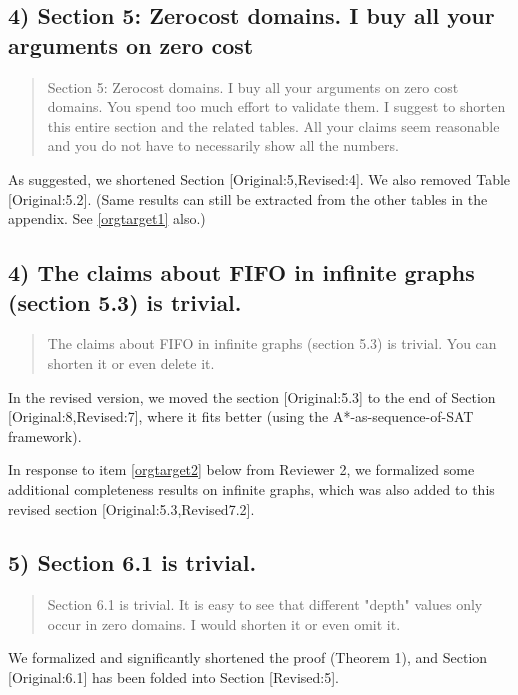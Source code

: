 \documentclass{article}
\begin{document}
\subsection{4) Section 5: Zerocost domains. I buy all your arguments on zero cost}
\label{sec:orgheadline4}

\begin{quote}
Section 5: Zerocost domains. I buy all your arguments on zero cost
domains. You spend too much effort to validate them. I suggest to
shorten this entire section and the related tables. All your claims
seem reasonable and you do not have to necessarily show all the
numbers.
\end{quote}

As suggested, we shortened Section [Original:5,Revised:4].
We also removed Table [Original:5.2].
(Same results can still be extracted from the other tables in the appendix. See \ref{orgtarget1} also.)

\subsection{4)  The claims about FIFO in infinite graphs (section 5.3) is trivial.}
\label{sec:orgheadline5}

\begin{quote}
The claims about FIFO in infinite graphs (section 5.3) is trivial. You can shorten it or even delete it.
\end{quote}

In the revised version, we moved the section [Original:5.3] to the end of Section [Original:8,Revised:7],
where it fits better (using the A*-as-sequence-of-SAT framework).

In response to item \ref{orgtarget2} below from Reviewer 2, 
we formalized some additional completeness results on infinite graphs,
which was also added to this revised section [Original:5.3,Revised7.2].

\subsection{5) Section 6.1 is trivial.}
\label{sec:orgheadline6}

\begin{quote}
Section 6.1 is trivial. It is easy to see that different "depth"
values only occur in zero domains. I would shorten it or even omit it.
\end{quote}

We formalized and significantly shortened the proof (Theorem 1),
and Section [Original:6.1] has been folded into Section [Revised:5].
\end{document}
